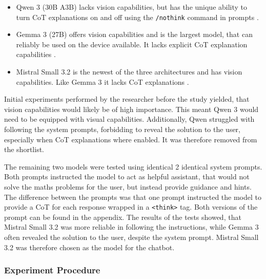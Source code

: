 \begin{itemize}
    \item Qwen 3 (30B A3B) lacks vision capabilities, but has the unique ability to turn \ac{CoT} explanations on and off using the \texttt{/nothink} command in prompts \parencite{Qwen2025}.

    \item Gemma 3 (27B) offers vision capabilities and is the largest model, that can reliably be used on the device available. It lacks explicit \ac{CoT} explanation capabilities \parencite{GemmaTeam2025}.

    \item Mistral Small 3.2 is the newest of the three architectures and has vision capabilities. Like Gemma 3 it lacks \ac{CoT} explanations \parencite{Mistral2025}.
\end{itemize}

Initial experiments performed by the researcher before the study yielded, that vision capabilities would likely be of high importance. This meant Qwen 3 would need to be equipped with visual capabilities. Additionally, Qwen struggled with following the system prompts, forbidding to reveal the solution to the user, especially when \ac{CoT} explanations where enabled. It was therefore removed from the shortlist.

The remaining two models were tested using identical 2 identical system prompts. Both prompts instructed the model to act as helpful assistant, that would not solve the maths problems for the user, but instead provide guidance and hints. The difference between the prompts was that one prompt instructed the model to provide a \ac{CoT} for each response wrapped in a \texttt{<think>} tag. Both versions of the prompt can be found in the appendix. The results of the tests showed, that Mistral Small 3.2 was more reliable in following the instructions, while Gemma 3 often revealed the solution to the user, despite the system prompt. Mistral Small 3.2 was therefore chosen as the model for the chatbot.

\subsubsection{Experiment Procedure} \label{sssec:experiment_procedure}

